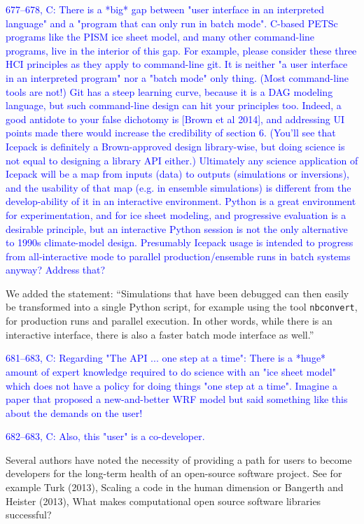 \documentclass{article}
\theoremstyle{definition}
\theoremstyle{plain}
\begin{document}
\textcolor{blue}{677--678, C:  There is a *big* gap between "user interface in an interpreted language" and a "program that can only run in batch mode".  C-based PETSc programs like the PISM ice sheet model, and many other command-line programs, live in the interior of this gap.  For example, please consider these three HCI principles as they apply to command-line git.  It is neither "a user interface in an interpreted program" nor a "batch mode" only thing.  (Most command-line tools are not!)  Git has a steep learning curve, because it is a DAG modeling language, but such command-line design can hit your principles too.  Indeed, a good antidote to your false dichotomy is [Brown et al 2014], and addressing UI points made there would increase the credibility of section 6.  (You'll see that Icepack is definitely a Brown-approved design library-wise, but doing science is not equal to designing a library API either.)  Ultimately any science application of Icepack will be a map from inputs (data) to outputs (simulations or inversions), and the usability of that map (e.g. in ensemble simulations) is different from the develop-ability of it in an interactive environment.  Python is a great environment for experimentation, and for ice sheet modeling, and progressive evaluation is a desirable principle, but an interactive Python session is not the only alternative to 1990s climate-model design.  Presumably Icepack usage is intended to progress from all-interactive mode to parallel production/ensemble runs in batch systems anyway?  Address that?}

We added the statement: ``Simulations that have been debugged can then easily be transformed into a single Python script, for example using the tool \texttt{nbconvert}, for production runs and parallel execution.
In other words, while there is an interactive interface, there is also a faster batch mode interface as well.''

\textcolor{blue}{681--683, C:  Regarding "The API ... one step at a time":  There is a *huge* amount of expert knowledge required to do science with an "ice sheet model" which does not have a policy for doing things "one step at a time".  Imagine a paper that proposed a new-and-better WRF model but said something like this about the demands on the user!}

\textcolor{blue}{682--683, C:  Also, this "user" is a co-developer.}

Several authors have noted the necessity of providing a path for users to become developers for the long-term health of an open-source software project.
See for example Turk (2013), Scaling a code in the human dimension or Bangerth and Heister (2013), What makes computational open source software libraries successful?
\end{document}
